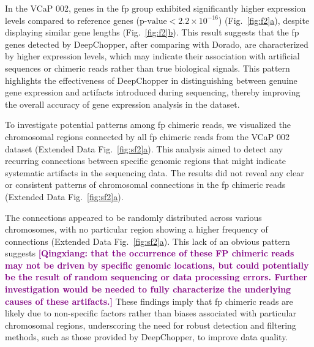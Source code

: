 \documentclass[pdflatex, sn-mathphys-num, lineno]{sn-jnl}%
\newcommand{\qx}[1]{\textcolor{purple}{\textbf{[Qingxiang: #1]}}}
\newcommand{\figref}[2]{Fig.~\hyperref[#1]{\ref*{#1}#2}}
\newcommand{\edfigref}[2]{Extended Data Fig.~\hyperref[#1]{\ref*{#1}#2}}
\theoremstyle{thmstyleone}%
\theoremstyle{thmstyletwo}%
\theoremstyle{thmstylethree}%
\begin{document}
In the VCaP 002, genes in the \gls{fp} group exhibited significantly higher expression levels compared to reference genes (\(\textrm{p-value} < 2.2 \times 10^{-16}\)) (\figref{fig:f2}{a}), despite displaying similar gene lengths (\figref{fig:f2}{b}).
This result suggests that the \gls{fp} genes detected by DeepChopper, after comparing with Dorado, are characterized by higher expression levels, which may indicate their association with artificial sequences or chimeric reads rather than true biological signals.
This pattern highlights the effectiveness of DeepChopper in distinguishing between genuine gene expression and artifacts introduced during sequencing, thereby improving the overall accuracy of gene expression analysis in the dataset.

To investigate potential patterns among \gls{fp} chimeric reads, we visualized the chromosomal regions connected by all \gls{fp} chimeric reads from the VCaP 002 dataset (\edfigref{fig:sf2}{a}).
This analysis aimed to detect any recurring connections between specific genomic regions that might indicate systematic artifacts in the sequencing data.
The results did not reveal any clear or consistent patterns of chromosomal connections in the \gls{fp} chimeric reads  (\edfigref{fig:sf2}{a}).

The connections appeared to be randomly distributed across various chromosomes, with no particular region showing a higher frequency of connections (\edfigref{fig:sf2}{a}).
This lack of an obvious pattern suggests \qx{that the occurrence of these FP chimeric reads may not be driven by specific genomic locations, but could potentially be the result of random sequencing or data processing errors. Further investigation would be needed to fully characterize the underlying causes of these artifacts.}
These findings imply that \gls{fp} chimeric reads are likely due to non-specific factors rather than biases associated with particular chromosomal regions, underscoring the need for robust detection and filtering methods, such as those provided by DeepChopper, to improve data quality.
\end{document}
